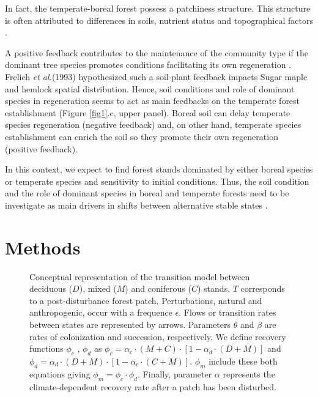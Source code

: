In fact, the temperate-boreal
forest possess a patchiness structure. This structure is often attributed to
differences in soils, nutrient status and topographical factors
\cite{Society2014}.


A positive feedback contributes to the maintenance of the community type if
the dominant tree species promotes conditions facilitating its own
regeneration \cite{Barras1998}. Frelich \textit{et al.}(1993)
\cite{Society2014} hypothesized such a soil-plant feedback impacts Sugar maple
and hemlock spatial distribution. Hence, soil conditions and role of dominant
species in regeneration seems to act as main feedbacks on the temperate forest
establishment (Figure \ref{fig1}.c, upper panel). Boreal soil can delay
temperate species regeneration (negative feedback) and, on other hand,
temperate species establishment can enrich the soil so they promote their own
regeneration (positive feedback).


In this context, we expect to find forest stands dominated by either boreal
species or temperate species and sensitivity to initial conditions. Thus, the
soil condition and the role of dominant species in boreal and temperate
forests need to be investigate as main drivers in shifts between alternative
stable states \cite{Kellman2004,Moore2008,DeFrenne2013,Barras1998}.





\section{Methods}   

\begin{figure}
	
	\caption{Conceptual representation of the transition model between deciduous ($D$),
	mixed ($M$) and coniferous ($C$) stands. $T$ corresponds to a post-disturbance forest patch. Perturbations, natural and anthropogenic, occur with a frequence $\epsilon$. 
	Flows or transition rates between states are represented by arrows.
	Parameters $\theta$ and $\beta$ are rates of colonization and succession,
	respectively. We define recovery functions $\phi_c$ , $\phi_d$ as $\phi_c
	= \alpha_c \cdot (M+C) \cdot [1- \alpha_d \cdot (D+M)]$ and $\phi_d =
	\alpha_d \cdot (D+M) \cdot [1- \alpha_c \cdot (C+M)]$. $\phi_m$ include these both equations giving $\phi_m = \phi_c \cdot \phi_d$. Finally, parameter $\alpha$ represents the climate-dependent recovery rate after a patch has been disturbed.}
	\label{Model}
	\vspace{-1em}
\end{figure}


